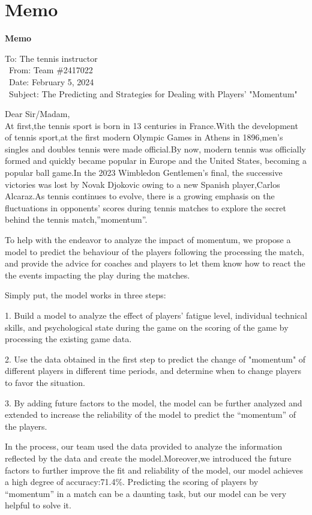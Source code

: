 \documentclass[12pt]{article}
\begin{document}
\section{Memo}
\begin{center}
      \textbf{Memo}
\end{center}
To: The tennis instructor\\
\ From: Team \#2417022\\
\ Date: February 5, 2024\\
\ Subject: The Predicting and Strategies for Dealing with Players' "Momentum"

Dear Sir/Madam,\\

At first,the tennis sport is born in 13 centuries in France.With the development of tennis sport,at the first modern Olympic Games in Athens in 1896,men's singles and doubles tennis were made official.By now, modern tennis was officially formed and quickly became popular in Europe and the United States, becoming a popular ball game.In the 2023 Wimbledon Gentlemen's final, the successive victories was lost by Novak Djokovic owing to a new Spanish player,Carlos Alcaraz.As tennis continues to evolve, there is a growing emphasis on the fluctuations in opponents' scores during tennis matches to explore the secret behind the tennis match,”momentum”.

To help with the endeavor to analyze the impact of momentum, we propose a model to predict the behaviour of the players following the processing the match, and provide the advice for coaches and players to let them know how to react the the events impacting the play during the matches.

Simply put, the model works in three steps:

1. Build a model to analyze the effect of players' fatigue level, individual technical skills, and psychological state during the game on the scoring of the game by processing the existing game data.

2. Use the data obtained in the first step to predict the change of "momentum" of different players in different time periods, and determine when to change players to favor the situation.

3. By adding future factors to the model, the model can be further analyzed and extended to increase the reliability of the model to predict the “momentum” of the players.

In the process, our team used the data provided to analyze the information reflected by the data and create the model.Moreover,we introduced the future factors to further improve the fit and reliability of the model, our model achieves a high degree of accuracy:71.4\%. Predicting the scoring of players by “momentum” in a match can be a daunting task, but our model can be very helpful to solve it.
\end{document}
